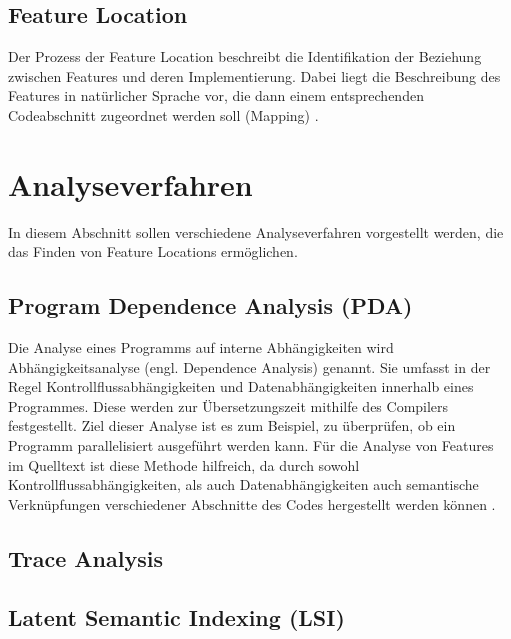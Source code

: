 \documentclass[runningheads,a4paper]{llncs}
\begin{document}
\subsection*{Feature Location}
Der Prozess der Feature Location beschreibt die Identifikation der Beziehung zwischen Features und deren Implementierung. Dabei liegt die Beschreibung des Features in natürlicher Sprache vor, die dann einem entsprechenden Codeabschnitt zugeordnet werden soll (Mapping) \cite{survey}.

\section{Analyseverfahren}

In diesem Abschnitt sollen verschiedene Analyseverfahren vorgestellt werden, die das Finden von Feature Locations ermöglichen.


\subsection*{Program Dependence Analysis (PDA)}

Die Analyse eines Programms auf interne Abhängigkeiten wird Abhängigkeitsanalyse (engl. Dependence Analysis) genannt. Sie umfasst in der Regel Kontrollflussabhängigkeiten und Datenabhängigkeiten innerhalb eines Programmes. Diese werden zur Übersetzungszeit mithilfe des Compilers festgestellt. Ziel dieser Analyse ist es zum Beispiel, zu überprüfen, ob ein Programm parallelisiert ausgeführt werden kann. Für die Analyse von Features im Quelltext ist diese Methode hilfreich, da durch sowohl Kontrollflussabhängigkeiten, als auch Datenabhängigkeiten auch semantische Verknüpfungen verschiedener Abschnitte des Codes hergestellt werden können \cite{PDA}.

\subsection*{Trace Analysis}

\subsection*{Latent Semantic Indexing (LSI)}
\end{document}
